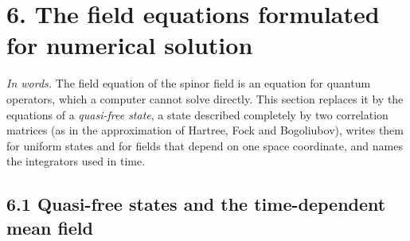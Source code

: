 \documentclass[
  10pt,
]{article}
\begin{document}
\hypertarget{the-field-equations-formulated-for-numerical-solution}{%
\section{6. The field equations formulated for numerical
solution}\label{the-field-equations-formulated-for-numerical-solution}}

\emph{In words.} The field equation of the spinor field is an equation
for quantum operators, which a computer cannot solve directly. This
section replaces it by the equations of a \emph{quasi-free state}, a
state described completely by two correlation matrices (as in the
approximation of Hartree, Fock and Bogoliubov), writes them for uniform
states and for fields that depend on one space coordinate, and names the
integrators used in time.

\hypertarget{quasi-free-states-and-the-time-dependent-mean-field}{%
\subsection{6.1 Quasi-free states and the time-dependent mean
field}\label{quasi-free-states-and-the-time-dependent-mean-field}}
\end{document}
